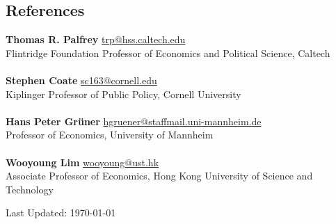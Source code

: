 \documentclass[margin, letterpaper]{res}
\begin{document}
\begin{resume}
\section{References} \textbf{Thomas R. Palfrey} \href{mailto:trp@hss.caltech.edu}{trp@hss.caltech.edu}\\
Flintridge Foundation Professor of Economics and Political Science, Caltech\\\\
\textbf{Stephen Coate} \href{mailto:sc163@cornell.edu}{sc163@cornell.edu}\\
Kiplinger Professor of Public Policy, Cornell University\\\\
\textbf{Hans Peter Gr\"{u}ner} \href{mailto:hgruener@staffmail.uni-mannheim.de}{hgruener@staffmail.uni-mannheim.de}\\
Professor of Economics, University of Mannheim\\\\
\textbf{Wooyoung Lim} \href{mailto:wooyoung@ust.hk}{wooyoung@ust.hk}\\
Associate Professor of Economics, Hong Kong University of Science and Technology
\begin{flushright}
Last Updated: \today
\end{flushright}
\end{resume} 
\end{document}
